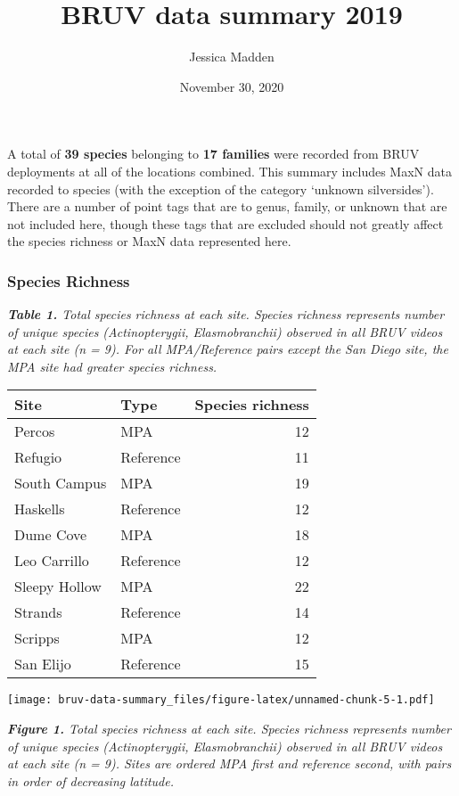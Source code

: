\documentclass[]{article}
\title{BRUV data summary 2019}
\author{Jessica Madden}
\date{November 30, 2020}
\begin{document}
\maketitle

A total of \textbf{39 species} belonging to \textbf{17 families} were
recorded from BRUV deployments at all of the locations combined. This
summary includes MaxN data recorded to species (with the exception of
the category `unknown silversides'). There are a number of point tags
that are to genus, family, or unknown that are not included here, though
these tags that are excluded should not greatly affect the species
richness or MaxN data represented here.

\subsubsection{Species Richness}\label{species-richness}

\emph{\textbf{Table 1.} Total species richness at each site. Species
richness represents number of unique species (Actinopterygii,
Elasmobranchii) observed in all BRUV videos at each site (n = 9). For
all MPA/Reference pairs except the San Diego site, the MPA site had
greater species richness.}

\begin{table}[H]
\centering
\begin{tabular}[t]{l|l|r}
\hline
Site & Type & Species richness\\
\hline
Percos & MPA & 12\\
\hline
Refugio & Reference & 11\\
\hline
South Campus & MPA & 19\\
\hline
Haskells & Reference & 12\\
\hline
Dume Cove & MPA & 18\\
\hline
Leo Carrillo & Reference & 12\\
\hline
Sleepy Hollow & MPA & 22\\
\hline
Strands & Reference & 14\\
\hline
Scripps & MPA & 12\\
\hline
San Elijo & Reference & 15\\
\hline
\end{tabular}
\end{table}

\texttt{[image: bruv-data-summary\_files/figure-latex/unnamed-chunk-5-1.pdf]}

\emph{\textbf{Figure 1.} Total species richness at each site. Species
richness represents number of unique species (Actinopterygii,
Elasmobranchii) observed in all BRUV videos at each site (n = 9). Sites
are ordered MPA first and reference second, with pairs in order of
decreasing latitude.}
\end{document}
